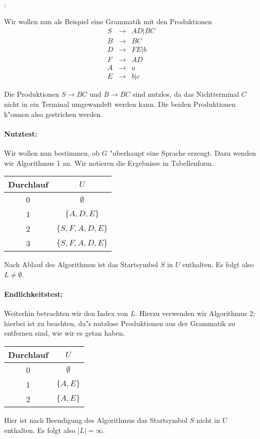 \example:{
  Wir wollen nun als Beispiel eine Grammatik mit
  den Produktionen
  \begin{eqnarray*}
    S &\to& AD | BC\\
    B &\to& BC\\
    D &\to& FE | b\\
    F &\to& AD\\
    A &\to& a\\
    E &\to& b | c
  \end{eqnarray*}
  
  Die Produktionen $S \to BC$ und $B \to BC$ sind nutzlos, da das
  Nichtterminal $C$ nicht in ein Terminal umgewandelt werden kann. Die
  beiden Produktionen k"onnen also gestrichen werden.
  
  \paragraph{Nutztest:} Wir wollen nun bestimmen, ob $G$ "uberhaupt eine
  Sprache erzeugt. Dazu wenden wir Algorithmus 1 an. Wir notieren die
  Ergebnisse in Tabellenform.
  
  \begin{center}
    \begin{tabular}[c]{c|c}
      Durchlauf & $U$ \\\hline
      0 & $\emptyset$\\
      1 & $\{A, D, E\}$\\
      2 & $\{S, F, A, D, E\}$\\
      3 & $\{S, F, A, D, E\}$
    \end{tabular}
  \end{center}
  
  Nach Ablauf des Algorithmus ist das Startsymbol $S$ in $U$
  enthalten. Es folgt also $L \not= \emptyset$.
  
  \paragraph{Endlichkeitstest:} Weiterhin betrachten wir den Index von
  $L$. Hierzu verwenden wir Algorithmus 2; hierbei ist zu beachten, da"s
  nutzlose Produktionen aus der Grammatik zu entfernen sind, wie wir es
  getan haben.
  
  \begin{center}
    \begin{tabular}{c|c}
      Durchlauf & $U$ \\\hline
      0 & $\emptyset$\\
      1 & $\{A, E\}$\\
      2 & $\{A, E\}$
    \end{tabular}
  \end{center}
  
  Hier ist nach Beendigung des Algorithmus das Startsymbol $S$
  nicht in $U$ enthalten. Es folgt also $|L| = \infty$.
  }
